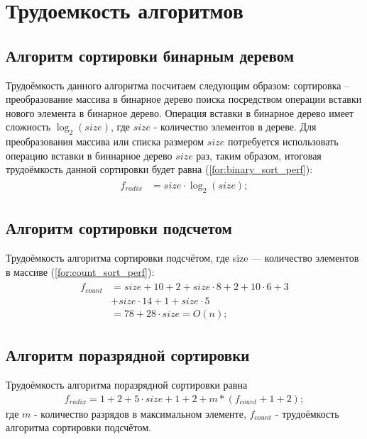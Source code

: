 \section{Трудоемкость алгоритмов}

\subsection{Алгоритм сортировки бинарным деревом}

Трудоёмкость данного алгоритма посчитаем следующим образом: сортировка -- преобразование массива в бинарное дерево поиска посредством операции вставки нового элемента в бинарное дерево.
Операция вставки в бинарное дерево имеет сложность $ \log_{2}(size)$, где $size$ - количество элементов в дереве.
Для преобразования массива или списка размером $size$ потребуется использовать операцию вставки в биннарное дерево $size$ раз, таким образом, итоговая трудоёмкость данной сортировки будет равна (\ref{for:binary_sort_perf}):
\begin{align}
	\begin{split}
		\label{for:binary_sort_perf}
		f_{radix} &= size \cdot \log_{2}(size);
	\end{split}
\end{align}


\subsection{Алгоритм сортировки подсчетом}

Трудоёмкость алгоритма сортировки подсчётом, где size --- количество элементов в массиве (\ref{for:count_sort_perf}):
\begin{align}
	\begin{split}
		\label{for:count_sort_perf}
		f_{count} &= size + 10  + 2 + size \cdot 8 + 2 + 10 \cdot 6 + 3 \\
		&+ size \cdot 14 + 1 + size \cdot 5 \\
		&= 78 + 28 \cdot size = O(n);
	\end{split}
\end{align}

\subsection{Алгоритм поразрядной сортировки}

Трудоёмкость алгоритма поразрядной сортировки равна %
\begin{align}
	\label{for:radix_sort_perf}
	f_{radix} = 1 + 2 + 5 \cdot size + 1 + 2 + m * (f_{count} + 1 + 2);
\end{align}
где $m$ - количество разрядов в максимальном элементе, $f_{count}$ - трудоёмкость алгоритма сортировки подсчётом.

